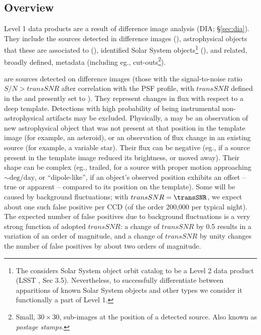 \documentclass[SE,lsstdraft,toc]{lsstdoc}
\newcommand{\newtext}[1]{{\color{blue} #1}}
\newcommand{\marginreq}[1]{\marginpar{\hspace{0pt}\tiny #1}}
\newcommand{\reqparam}[1]{\marginreq{#1}}
\begin{document}
\subsection{Overview}

Level 1 data products are a result of difference image analysis (DIA; \S \ref{sec:dia}). They include the sources detected in difference images (\DIASources), astrophysical objects that these are associated to (\DIAObjects), identified Solar System objects\footnote{The \SRD considers Solar System object orbit catalog to be a Level 2 data product (LSST \SRD, Sec 3.5). Nevertheless, to successfully differentiate between apparitions of known Solar System objects and other types \DIASources we consider it functionally a part of Level 1.} (\SSObject), and related, broadly defined, metadata (including eg., cut-outs\footnote{Small, $30 \times 30$, sub-images at the position of a detected source. Also known as \emph{postage stamps.}}).

\DIASources are sources detected on difference images (those with the signal-to-noise ratio $S/N>transSNR$ after correlation with the PSF profile, with $transSNR$\reqparam{transSNR} defined in the \SRD and presently set to \transSNR). They represent changes in flux with respect to a deep template. \newtext{Detections with high probability of being instrumental non-astrophysical artifacts may be excluded.} Physically, a \DIASource may be an observation of new astrophysical object that was not present at that position in the template image (for example, an asteroid), or an observation of flux change in an existing source (for example, a variable star). Their flux can be negative (eg., if a source present in the template image reduced its brightness, or moved away). Their shape can be complex (eg., trailed, for a source with proper motion approaching $\sim \mathrm{deg}/\mathrm{day}$, or ``dipole-like'', if an object's observed position exhibits an offset -- true or apparent -- compared to its position on the template).
Some \DIASources will be caused by background fluctuations; with $transSNR = \transSNR$,
we expect about one such false positive per CCD (of the order 200,000 per typical night). The expected number of false
positives due to background fluctuations is a very strong function of adopted $transSNR$: a change of $transSNR$ by 0.5
results in a variation of an order of magnitude, and a change of $transSNR$ by unity changes the number of false
positives by about two orders of magnitude.
\end{document}

